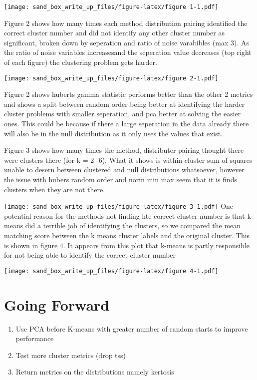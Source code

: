\documentclass[
]{article}
\providecommand{\tightlist}{%
  \setlength{\itemsep}{0pt}\setlength{\parskip}{0pt}}
\begin{document}
\texttt{[image: sand\_box\_write\_up\_files/figure-latex/figure 1-1.pdf]}

Figure 2 shows how many times each method distribution pairing
identified the correct cluster number and did not identify any other
cluster number as significant, broken down by seperation and ratio of
noise varabibles (max 3). As the ratio of noise variables increasesand
the seperation value decreases (top right of each figure) the clustering
problem gets harder.

\texttt{[image: sand\_box\_write\_up\_files/figure-latex/figure 2-1.pdf]}

Figure 2 shows huberts gamma statistic performs better than the other 2
metrics and shows a split between random order being better at
identifying the harder cluster problems with smaller seperation, and pca
better at solving the easier ones. This could be because if there a
large seperation in the data already there will also be in the null
distribution as it only uses the values that exist.

Figure 3 shows how many times the method, distributer pairing thought
there were clusters there (for k = 2 -6). What it shows is within
cluster sum of squares unable to desern between clustered and null
distributions whatsoever, however the issue with hubers random order and
norm min max seem that it is finds clusters when they are not there.

\texttt{[image: sand\_box\_write\_up\_files/figure-latex/figure 3-1.pdf]}
One potential reason for the methods not finding hte correct cluster
number is that k-means did a terrible job of identifying the clusters,
so we compared the mean matching score between the k means cluster
labels and the original cluster. This is shown in figure 4. It appears
from this plot that k-means is partly responsible for not being able to
identify the correct cluster number

\texttt{[image: sand\_box\_write\_up\_files/figure-latex/figure 4-1.pdf]}

\hypertarget{going-forward}{%
\section{Going Forward}\label{going-forward}}

\begin{enumerate}
\def\labelenumi{\arabic{enumi}.}
\tightlist
\item
  Use PCA before K-means with greater number of random starts to improve
  performance
\item
  Test more cluster metrics (drop tss)
\item
  Return metrics on the distributions namely kertosis
\end{enumerate}
\end{document}
